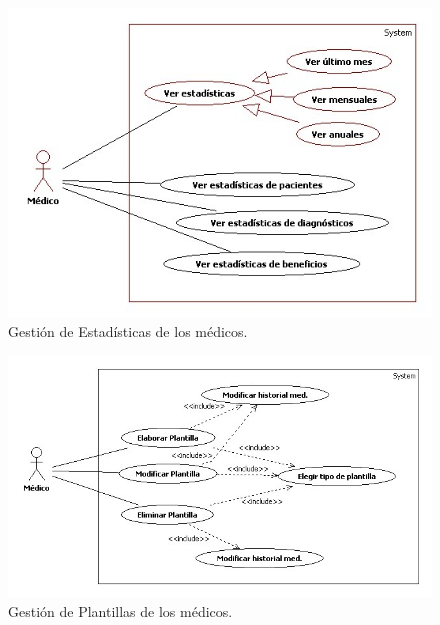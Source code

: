 \documentclass[a4paper,oneside,11pt]{book}
\begin{document}
				\begin{figure}[H]
				  \centering
				    \includegraphics[width=12cm]{img/jpg/casos_uso/Estadisticas.jpg}
				  \caption{Gestión de Estadísticas de los médicos.}
				  \label{fig:estad_med}
				\end{figure}
				
				\begin{figure}[H]
				  \centering
				    \includegraphics[width=14cm]{img/jpg/casos_uso/Gestion_plantillas.jpg}
				  \caption{Gestión de Plantillas de los médicos.}
				  \label{fig:plan_med}
				\end{figure}
				
\end{document}
